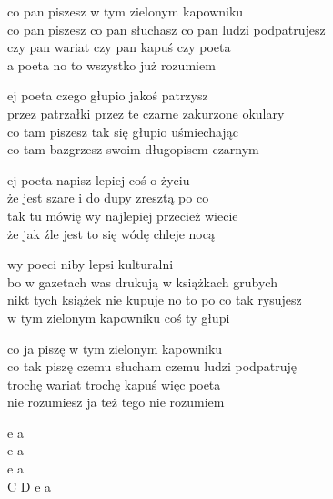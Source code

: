 \begin{text}
    \small{
    co pan piszesz w tym zielonym kapowniku\\
    co pan piszesz co pan słuchasz co pan ludzi podpatrujesz\\
    czy pan wariat czy pan kapuś czy poeta\\
    a poeta no to wszystko już rozumiem

    ej poeta czego głupio jakoś patrzysz\\
    przez patrzałki przez te czarne zakurzone okulary\\
    co tam piszesz tak się głupio uśmiechając\\
    co tam bazgrzesz swoim długopisem czarnym

    ej poeta napisz lepiej coś o życiu\\
    że jest szare i do dupy zresztą po co\\
    tak tu mówię wy najlepiej przecież wiecie\\
    że jak źle jest to się wódę chleje nocą

    wy poeci niby lepsi kulturalni\\
    bo w gazetach was drukują w książkach grubych\\
    nikt tych książek nie kupuje no to po co tak rysujesz\\
    w tym zielonym kapowniku coś ty głupi

    co ja piszę w tym zielonym kapowniku\\
    co tak piszę czemu słucham czemu ludzi podpatruję\\
    trochę wariat trochę kapuś więc poeta\\
    nie rozumiesz ja też tego nie rozumiem
    }
\end{text}
\begin{chord}
    \small{
    e a\\
    e a\\
    e a\\
    C D e a
    }
\end{chord}